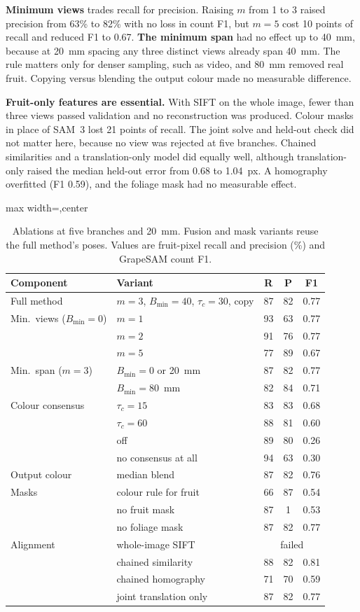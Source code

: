 \textbf{Minimum views} trades recall for precision. Raising $m$ from 1 to 3 raised precision from 63\% to 82\% with no loss in count F1, but $m=5$ cost 10 points of recall and reduced F1 to 0.67. \textbf{The minimum span} had no effect up to 40~mm, because at 20~mm spacing any three distinct views already span 40~mm. The rule matters only for denser sampling, such as video, and 80~mm removed real fruit. Copying versus blending the output colour made no measurable difference.

\textbf{Fruit-only features are essential.} With SIFT on the whole image, fewer than three views passed validation and no reconstruction was produced. Colour masks in place of SAM~3 lost 21 points of recall. The joint solve and held-out check did not matter here, because no view was rejected at five branches. Chained similarities and a translation-only model did equally well, although translation-only raised the median held-out error from 0.68 to 1.04~px. A homography overfitted (F1 0.59), and the foliage mask had no measurable effect.

\begin{table}[t]
\centering
\caption{Ablations at five branches and 20~mm. Fusion and mask variants reuse the full method's poses. Values are fruit-pixel recall and precision (\%) and GrapeSAM count F1.}
\label{tab:ablation}
\scriptsize
\setlength{\tabcolsep}{4pt}
\begin{adjustbox}{max width=\linewidth,center}
\begin{tabular}{@{}llccc@{}}
\toprule
Component & Variant & R & P & F1\\
\midrule
Full method & $m{=}3$, $B_{\min}{=}40$, $\tau_c{=}30$, copy & 87 & 82 & 0.77\\
Min.\ views ($B_{\min}{=}0$) & $m=1$ & 93 & 63 & 0.77\\
 & $m=2$ & 91 & 76 & 0.77\\
 & $m=5$ & 77 & 89 & 0.67\\
Min.\ span ($m{=}3$) & $B_{\min}=0$ or 20~mm & 87 & 82 & 0.77\\
 & $B_{\min}=80$~mm & 82 & 84 & 0.71\\
Colour consensus & $\tau_c=15$ & 83 & 83 & 0.68\\
 & $\tau_c=60$ & 88 & 81 & 0.60\\
 & off & 89 & 80 & 0.26\\
 & no consensus at all & 94 & 63 & 0.30\\
Output colour & median blend & 87 & 82 & 0.76\\
Masks & colour rule for fruit & 66 & 87 & 0.54\\
 & no fruit mask & 87 & 1 & 0.53\\
 & no foliage mask & 87 & 82 & 0.77\\
Alignment & whole-image SIFT & \multicolumn{3}{c}{failed}\\
 & chained similarity & 88 & 82 & 0.81\\
 & chained homography & 71 & 70 & 0.59\\
 & joint translation only & 87 & 82 & 0.77\\
\bottomrule
\end{tabular}
\end{adjustbox}
\end{table}


